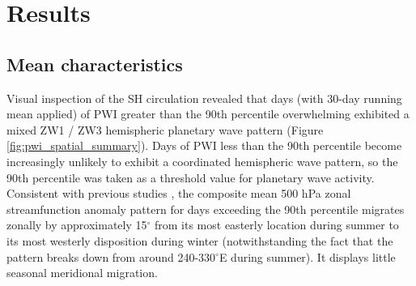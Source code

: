 \section{Results}

\subsection{Mean characteristics}

Visual inspection of the SH circulation revealed that days (with 30-day running mean applied) of PWI greater than the 90th percentile overwhelming exhibited a mixed ZW1 / ZW3 hemispheric planetary wave pattern (Figure \ref{fig:pwi_spatial_summary}). Days of PWI less than the 90th percentile become increasingly unlikely to exhibit a coordinated hemispheric wave pattern, so the 90th percentile was taken as a threshold value for planetary wave activity. Consistent with previous studies \citep{vanLoon1984,Mo1985}, the composite mean 500 hPa zonal streamfunction anomaly pattern for days exceeding the 90th percentile migrates zonally by approximately 15$^{\circ}$ from its most easterly location during summer to its most westerly disposition during winter (notwithstanding the fact that the pattern breaks down from around 240-330$^{\circ}$E during summer). It displays little seasonal meridional migration.
